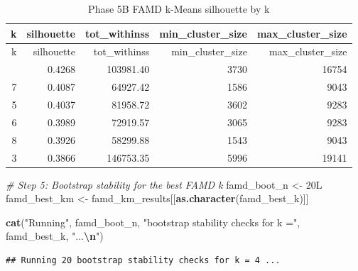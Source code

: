 \documentclass[
]{article}
\newenvironment{Shaded}{\begin{snugshade}}{\end{snugshade}}
\newcommand{\CommentTok}[1]{\textcolor[rgb]{0.56,0.35,0.01}{\textit{#1}}}
\newcommand{\DataTypeTok}[1]{\textcolor[rgb]{0.13,0.29,0.53}{#1}}
\newcommand{\DecValTok}[1]{\textcolor[rgb]{0.00,0.00,0.81}{#1}}
\newcommand{\FunctionTok}[1]{\textcolor[rgb]{0.13,0.29,0.53}{\textbf{#1}}}
\newcommand{\NormalTok}[1]{#1}
\newcommand{\OtherTok}[1]{\textcolor[rgb]{0.56,0.35,0.01}{#1}}
\newcommand{\SpecialCharTok}[1]{\textcolor[rgb]{0.81,0.36,0.00}{\textbf{#1}}}
\newcommand{\StringTok}[1]{\textcolor[rgb]{0.31,0.60,0.02}{#1}}
\begin{document}
\begin{longtable}[]{@{}rrrrr@{}}
\caption{Phase 5B FAMD k-Means silhouette by k}\tabularnewline
\toprule\noalign{}
k & silhouette & tot\_withinss & min\_cluster\_size &
max\_cluster\_size \\
\midrule\noalign{}
\endfirsthead
\toprule\noalign{}
k & silhouette & tot\_withinss & min\_cluster\_size &
max\_cluster\_size \\
\midrule\noalign{}
\endhead
\bottomrule\noalign{}
\endlastfoot
4 & 0.4268 & 103981.40 & 3730 & 16754 \\
7 & 0.4087 & 64927.42 & 1586 & 9043 \\
5 & 0.4037 & 81958.72 & 3602 & 9283 \\
6 & 0.3989 & 72919.57 & 3065 & 9283 \\
8 & 0.3926 & 58299.88 & 1543 & 9043 \\
3 & 0.3866 & 146753.35 & 5996 & 19141 \\
\end{longtable}

\begin{Shaded}
\begin{Highlighting}[]
\CommentTok{\# Step 5: Bootstrap stability for the best FAMD k}
\NormalTok{famd\_boot\_n }\OtherTok{\textless{}{-}} \DecValTok{20}\DataTypeTok{L}
\NormalTok{famd\_best\_km }\OtherTok{\textless{}{-}}\NormalTok{ famd\_km\_results[[}\FunctionTok{as.character}\NormalTok{(famd\_best\_k)]]}

\FunctionTok{cat}\NormalTok{(}\StringTok{"Running"}\NormalTok{, famd\_boot\_n, }\StringTok{"bootstrap stability checks for k ="}\NormalTok{,}
\NormalTok{    famd\_best\_k, }\StringTok{"...}\SpecialCharTok{\textbackslash{}n}\StringTok{"}\NormalTok{)}
\end{Highlighting}
\end{Shaded}

\begin{verbatim}
## Running 20 bootstrap stability checks for k = 4 ...
\end{verbatim}
\end{document}

